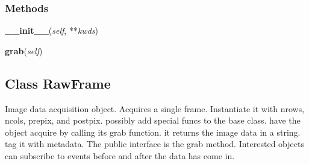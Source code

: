   \subsubsection{Methods}

    \label{ociw:AbstractFrame:__init__}

    \vspace{0.5ex}

    \begin{boxedminipage}{\textwidth}

    \raggedright \textbf{\_\_init\_\_}(\textit{self}, **\textit{kwds})

    \end{boxedminipage}

    \label{ociw:AbstractFrame:grab}

    \vspace{0.5ex}

    \begin{boxedminipage}{\textwidth}

    \raggedright \textbf{grab}(\textit{self})

    \end{boxedminipage}



\subsection{Class RawFrame}

    \label{ociw:RawFrame}
Image data acquisition object. Acquires a single frame. Instantiate it with
nrows, ncols, prepix, and postpix. possibly add special funcs to the base 
class. have the object acquire by calling its grab function. it returns the
image data in a string. tag it with metadata. The public interface is the 
grab method. Interested objects can subscribe to events before and after 
the data has come in.


